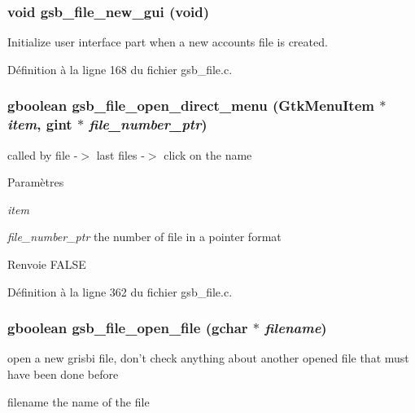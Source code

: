 \subsubsection[{gsb\_\-file\_\-new\_\-gui}]{\setlength{\rightskip}{0pt plus 5cm}void gsb\_\-file\_\-new\_\-gui (void)}\label{gsb__file_8h_a6905aa328e960638de7ede0c72e89d32}
Initialize user interface part when a new accounts file is created. 

Définition à la ligne 168 du fichier gsb\_\-file.c.

\subsubsection[{gsb\_\-file\_\-open\_\-direct\_\-menu}]{\setlength{\rightskip}{0pt plus 5cm}gboolean gsb\_\-file\_\-open\_\-direct\_\-menu (GtkMenuItem $\ast$ {\em item}, \/  gint $\ast$ {\em file\_\-number\_\-ptr})}\label{gsb__file_8h_ae81c7e970f67f50db0660466c2a05ac3}
called by file -\/$>$ last files -\/$>$ click on the name


\begin{DoxyParams}{Paramètres}
\item[{\em item}]\item[{\em file\_\-number\_\-ptr}]the number of file in a pointer format\end{DoxyParams}
\begin{DoxyReturn}{Renvoie}
FALSE 
\end{DoxyReturn}


Définition à la ligne 362 du fichier gsb\_\-file.c.

\subsubsection[{gsb\_\-file\_\-open\_\-file}]{\setlength{\rightskip}{0pt plus 5cm}gboolean gsb\_\-file\_\-open\_\-file (gchar $\ast$ {\em filename})}\label{gsb__file_8h_a2fe6126d5b7bb969ed720deca0e4ce89}
open a new grisbi file, don't check anything about another opened file that must have been done before

filename the name of the file

